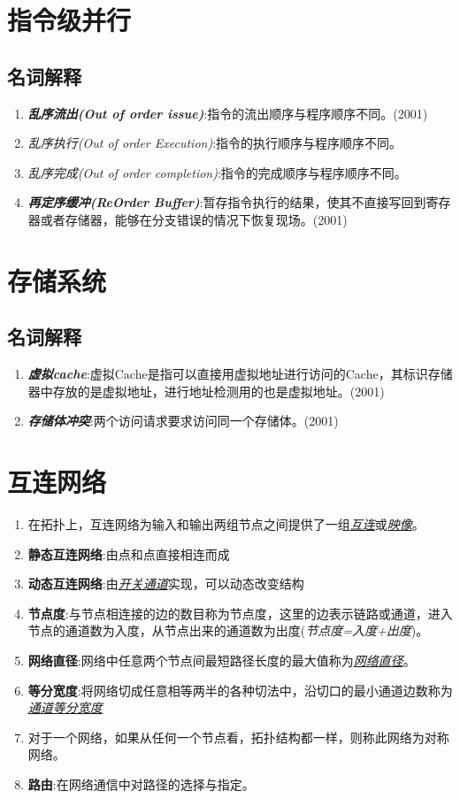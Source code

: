 \documentclass[a4paper]{ctexart}
\begin{document}
\section{指令级并行}
\subsection{名词解释}
\begin{enumerate}
  \item \emph{\textbf{乱序流出(Out of order issue)}}:指令的流出顺序与程序顺序不同。(2001)
  \item \emph{乱序执行(Out of order Execution)}:指令的执行顺序与程序顺序不同。
  \item \emph{乱序完成(Out of order completion)}:指令的完成顺序与程序顺序不同。
  \item \emph{\textbf{再定序缓冲(ReOrder Buffer)}}:暂存指令执行的结果，使其不直接写回到寄存器或者存储器，能够在分支错误的情况下恢复现场。(2001)
\end{enumerate}

\section{存储系统}
\subsection{名词解释}
\begin{enumerate}
  \item \emph{\textbf{虚拟cache}}:虚拟Cache是指可以直接用虚拟地址进行访问的Cache，其标识存储器中存放的是虚拟地址，进行地址检测用的也是虚拟地址。(2001)
  \item \emph{\textbf{存储体冲突}}:两个访问请求要求访问同一个存储体。(2001)
\end{enumerate}

\section{互连网络}

\begin{enumerate}
  \item 在拓扑上，互连网络为输入和输出两组节点之间提供了一组\emph{\underline{互连}}或\emph{\underline{映像}}。
  \item \textbf{静态互连网络}:由点和点直接相连而成
  \item \textbf{动态互连网络}:由\underline{\emph{开关通道}}实现，可以动态改变结构
  \item \textbf{节点度}:与节点相连接的边的数目称为节点度，这里的边表示链路或通道，进入节点的通道数为入度，从节点出来的通道数为出度(\emph{节点度=入度+出度})。
  \item \textbf{网络直径}:网络中任意两个节点间最短路径长度的最大值称为\underline{\emph{网络直径}}。
  \item \textbf{等分宽度}:将网络切成任意相等两半的各种切法中，沿切口的最小通道边数称为\underline{\emph{通道等分宽度}}
  \item 对于一个网络，如果从任何一个节点看，拓扑结构都一样，则称此网络为对称网络。
  \item \textbf{路由}:在网络通信中对路径的选择与指定。
\end{enumerate}
\end{document}
